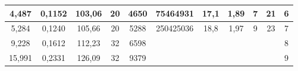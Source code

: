 \begin{sidewaystable}[]
\begin{tabular}{|c|c|c|c|c|c|c|c|c|c|c|}
    4,487                                                                   & 0,1152                                                                 & 103,06                                                               & 20                                                              & 4650                                                            & 75464931                                                        & 17,1                                                                    & 1,89                                                                 & 7                                                                     & 21                                                                    & 6                                                              \\ \hline
    5,284                                                                   & 0,1240                                                                 & 105,66                                                               & 20                                                              & 5288                                                            & 250425036                                                       & 18,8                                                                    & 1,97                                                                 & 9                                                                     & 23                                                                    & 7                                                              \\ \hline
    9,228                                                                   & 0,1612                                                                 & 112,23                                                               & 32                                                              & 6598                                                            &                                                                 &                                                                         &                                                                      &                                                                       &                                                                       & 8                                                              \\ \hline
    15,991                                                                  & 0,2331                                                                 & 126,09                                                               & 32                                                              & 9379                                                            &                                                                 &                                                                         &                                                                      &                                                                       &                                                                       & 9                                                              \\ \hline

\end{tabular}
\end{sidewaystable}

